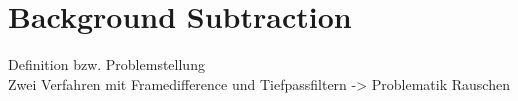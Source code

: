 \chapter{Background Subtraction}
Definition bzw. Problemstellung \\
Zwei Verfahren mit Framedifference und Tiefpassfiltern -> Problematik Rauschen
